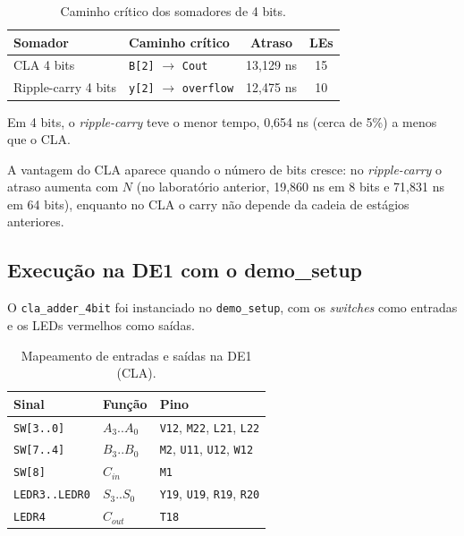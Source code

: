 \documentclass[report, 12pt]{uftreport}
\begin{document}
\begin{table}[htb]
  \centering
  \caption{Caminho crítico dos somadores de 4 bits.}
  \label{tab:tempos-4bits}
  \begin{tabular}{llcc}
    \toprule
    Somador & Caminho crítico & Atraso & LEs \\
    \midrule
    CLA 4 bits          & \texttt{B[2]} $\rightarrow$ \texttt{Cout}     & 13{,}129 ns & 15 \\
    Ripple-carry 4 bits & \texttt{y[2]} $\rightarrow$ \texttt{overflow} & 12{,}475 ns & 10 \\
    \bottomrule
  \end{tabular}
\end{table}

Em 4 bits, o \textit{ripple-carry} teve o menor tempo, 0{,}654 ns (cerca de 5\%) a menos que o CLA. 

A vantagem do CLA aparece quando o número de bits cresce: no \textit{ripple-carry} o atraso aumenta com $N$ (no laboratório anterior, 19{,}860 ns em 8 bits e 71{,}831 ns em 64 bits), enquanto no CLA o carry não depende da cadeia de estágios anteriores.

\subsection{Execução na DE1 com o demo\_setup}

O \texttt{cla\_adder\_4bit} foi instanciado no \texttt{demo\_setup}, com os \textit{switches} como entradas e os LEDs vermelhos como saídas.

\begin{table}[htb]
  \centering
  \caption{Mapeamento de entradas e saídas na DE1 (CLA).}
  \label{tab:pinos-cla}
  \begin{tabular}{lll}
    \toprule
    Sinal & Função & Pino \\
    \midrule
    \texttt{SW[3..0]} & $A_3..A_0$ & \texttt{V12}, \texttt{M22}, \texttt{L21}, \texttt{L22} \\
    \texttt{SW[7..4]} & $B_3..B_0$ & \texttt{M2}, \texttt{U11}, \texttt{U12}, \texttt{W12} \\
    \texttt{SW[8]}    & $C_{in}$   & \texttt{M1} \\
    \texttt{LEDR3..LEDR0} & $S_3..S_0$ & \texttt{Y19}, \texttt{U19}, \texttt{R19}, \texttt{R20} \\
    \texttt{LEDR4}    & $C_{out}$  & \texttt{T18} \\
    \bottomrule
  \end{tabular}
\end{table}
\end{document}
